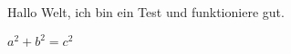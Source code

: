 \documentclass[12pt,ngerman]{scrartcl}
\begin{document}
Hallo Welt, ich bin ein Test und funktioniere gut.

\( a^2 + b^2 = c^2 \)
\end{document}
